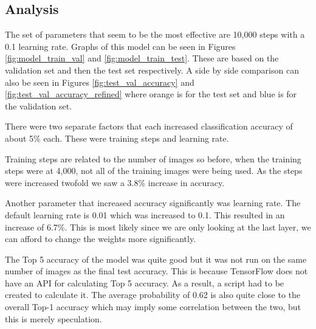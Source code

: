 \tocless\subsection{Analysis}
The set of parameters that seem to be the most
effective are 10,000 steps with a 0.1 learning rate. Graphs of this model can be
seen in Figures \ref{fig:model_train_val} and \ref{fig:model_train_test}. These
are based on the validation set and then the test set respectively. A side by
side comparison can also be seen in Figures \ref{fig:test_val_accuracy} and
\ref{fig:test_val_accuracy_refined} where orange is for the test set and blue is for the validation set.

There were two separate factors that each increased classification accuracy of
about 5\% each. These were training steps and learning rate.

Training steps are related to the number of images so before, when the training
steps were at 4,000, not all of the training images were being used. As the steps were increased
twofold we saw a 3.8\% increase in accuracy.

Another parameter that increased accuracy significantly was learning rate. The
default learning rate is 0.01 which was increased to 0.1. This resulted in an
increase of 6.7\%. This is most likely since we are only
looking at the last layer, we can afford to change the weights more
significantly.

The Top 5 accuracy of the model was quite good but it was not run on the same number of images as the final test accuracy.
This is because TensorFlow does not have an API for calculating Top 5 accuracy.
As a result, a script had to be created to calculate it.
The average probability of 0.62 is also quite close to the overall Top-1 accuracy which may imply some correlation between the two, but this is merely speculation.

\afterpage{\clearpage}
